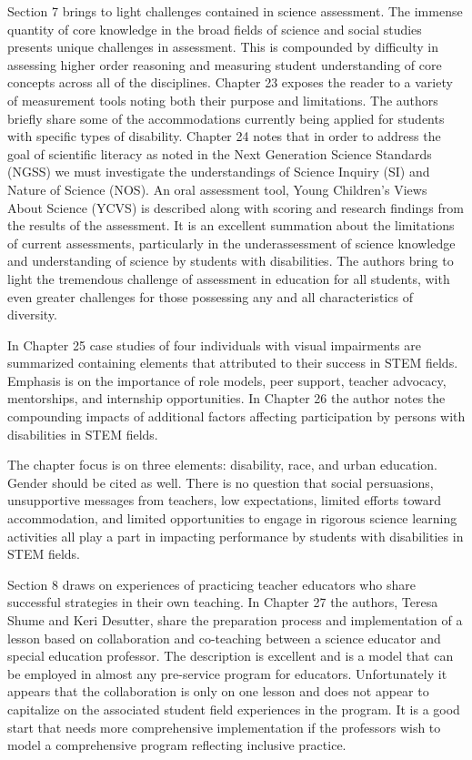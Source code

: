 \documentclass[11.5pt]{sig-alternate} %
\begin{document}
\begin{large}
Section 7 brings to light challenges contained in science assessment.  The immense quantity of core knowledge in the broad fields of science and social studies presents unique challenges in assessment.  This is compounded by difficulty in assessing higher order reasoning and measuring student understanding of core concepts across all of the disciplines.   Chapter 23 exposes the reader to a variety of measurement tools noting both their purpose and limitations.  The authors briefly share some of the accommodations currently being applied for students with specific types of disability.  Chapter 24 notes that in order to address the goal of scientific literacy as noted in the Next Generation Science Standards (NGSS) we must investigate the understandings of Science Inquiry (SI)  and Nature of Science (NOS).  An oral assessment tool, Young Children’s Views About Science (YCVS) is described along with scoring and research findings from the results of the assessment. It is an excellent summation about the limitations of current assessments, particularly in the underassessment of science knowledge and understanding of science by students with disabilities.  The authors bring to light the tremendous challenge of assessment in education for all students, with even greater challenges for those possessing any and all characteristics of diversity.

In Chapter 25 case studies of four individuals with visual impairments are summarized containing elements that attributed to their success in STEM fields. Emphasis is on the importance of role models, peer support, teacher advocacy, mentorships, and internship opportunities. In Chapter 26 the author notes the compounding impacts of additional factors affecting participation by persons with disabilities in STEM fields.

The chapter focus is on three elements: disability, race, and urban education.  Gender should be cited as well.  There is no question that social persuasions, unsupportive messages from teachers, low expectations, limited efforts toward accommodation, and limited opportunities to engage in rigorous science learning activities all play a part in impacting performance by students with disabilities in STEM fields.

Section 8 draws on experiences of practicing teacher educators who share successful strategies in their own teaching. In Chapter 27 the authors, Teresa Shume and Keri Desutter, share the preparation process and implementation of a lesson based on collaboration and co-teaching between a science educator and special education professor.  The description is excellent and is a model that can be employed in almost any pre-service program for educators.  Unfortunately it appears that the collaboration is only on one lesson and does not appear to capitalize on the associated student field experiences in the program. It is a good start that needs more comprehensive implementation if the professors wish to model a comprehensive program reflecting inclusive practice. 


\end{large}
\end{document}
